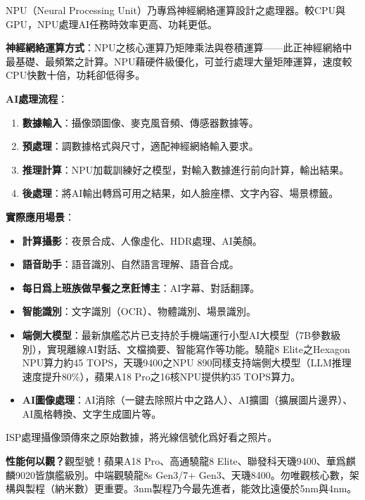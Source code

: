 NPU（Neural Processing Unit）乃專爲神經網絡運算設計之處理器。較CPU與GPU，NPU處理AI任務時效率更高、功耗更低。

\textbf{神經網絡運算方式}：NPU之核心運算乃矩陣乘法與卷積運算——此正神經網絡中最基礎、最頻繁之計算。NPU藉硬件級優化，可並行處理大量矩陣運算，速度較CPU快數十倍，功耗卻低得多。

\textbf{AI處理流程}：

\begin{enumerate}
  \item \textbf{數據輸入}：攝像頭圖像、麥克風音頻、傳感器數據等。
  \item \textbf{預處理}：調數據格式與尺寸，適配神經網絡輸入要求。
  \item \textbf{推理計算}：NPU加載訓練好之模型，對輸入數據進行前向計算，輸出結果。
  \item \textbf{後處理}：將AI輸出轉爲可用之結果，如人臉座標、文字內容、場景標籤。
\end{enumerate}

\textbf{實際應用場景}：

\begin{itemize}
  \item \textbf{計算攝影}：夜景合成、人像虛化、HDR處理、AI美顏。
  \item \textbf{語音助手}：語音識別、自然語言理解、語音合成。
  \item \textbf{每日爲上班族做早餐之烹飪博主}：AI字幕、對話翻譯。
  \item \textbf{智能識別}：文字識別（OCR）、物體識別、場景識別。
  \item \textbf{端側大模型}：最新旗艦芯片已支持於手機端運行小型AI大模型（7B參數級別），實現離線AI對話、文檔摘要、智能寫作等功能。驍龍8 Elite之Hexagon NPU算力約45 TOPS，天璣9400之NPU 890同樣支持端側大模型（LLM推理速度提升80\%），蘋果A18 Pro之16核NPU提供約35 TOPS算力。
  \item \textbf{AI圖像處理}：AI消除（一鍵去除照片中之路人）、AI擴圖（擴展圖片邊界）、AI風格轉換、文字生成圖片等。
\end{itemize}


ISP處理攝像頭傳來之原始數據，將光線信號化爲好看之照片。

\textbf{性能何以觀？}觀型號！蘋果A18 Pro、高通驍龍8 Elite、聯發科天璣9400、華爲麒麟9020皆旗艦級別。中端觀驍龍8s Gen3/7+ Gen3、天璣8400。勿唯觀核心數，架構與製程（納米數）更重要。3nm製程乃今最先進者，能效比遠優於5nm與4nm。


